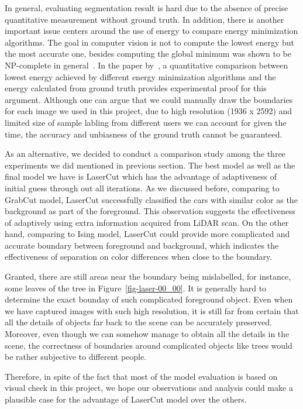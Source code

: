 \documentclass{article} %
\begin{document}
In general, evaluating segmentation result is hard due to the absence of precise quantitative measurement without ground truth. In addition, there is another important issue centers around the use of energy to compare energy minimization algorithms. The goal in computer vision is not to compute the lowest energy but the most accurate one, besides computing the global minimum was shown to be NP-complete in general~\citep{Boykov2001Fast}. In the paper by~\citet{Szeliski2008Comparative}, a quantitative comparison between lowest energy achieved by different energy minimization algorithms and the energy calculated from ground truth provides experimental proof for this argument. Although one can argue that we could manually draw the boundaries for each image we used in this project, due to high resolution (1936 x 2592) and limited size of sample labling from different users we can account for given the time, the accuracy and unbiasness of the ground truth cannot be guaranteed.

As an alternative, we decided to conduct a comparison study among the three experiments we did mentioned in previous section. The best model as well as the final model we have is LaserCut which has the advantage of adaptiveness of initial guess through out all iterations. As we discussed before, comparing to GrabCut model, LaserCut successfully classified the cars with similar color as the background as part of the foreground. This observation suggests the effectiveness of adaptively using extra information acquired from LiDAR scan. On the other hand, comparing to Ising model, LaserCut could provide more complicated and accurate boundary between foreground and background, which indicates the effectiveness of separation on color differences when close to the boundary.

Granted, there are still areas near the boundary being mislabelled, for instance, some leaves of the tree in Figure~\ref{fig-laser-00_00}. It is generally hard to determine the exact bounday of such complicated foreground object. Even when we have captured images with such high resolution, it is still far from certain that all the details of objects far back to the scene can be accurately preserved. Moreover, even though we can somehow manage to obtain all the details in the scene, the correctness of boundaries around complicated objects like trees would be rather subjective to different people.

Therefore, in spite of the fact that most of the model evaluation is based on visual check in this project, we hope our observations and analysis could make a plausible case for the advantage of LaserCut model over the others.
\end{document}
